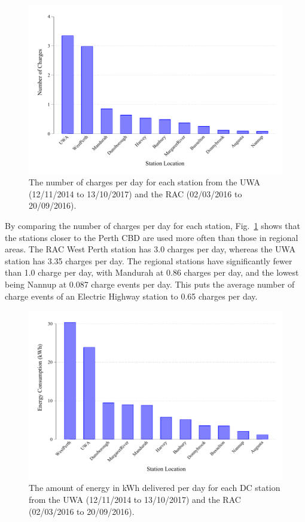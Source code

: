 \begin{figure}[H]
	\centering
	\includegraphics[width=0.8\linewidth]{dc_p}
	\caption[Number of charges per day for each station]{The number of charges per day for each station from the UWA (12/11/2014 to 13/10/2017) and the RAC (02/03/2016 to 20/09/2016).}
	\label{fig:10:dc_p}
\end{figure}

By comparing the number of charges per day for each station, Fig.~\ref{fig:10:dc_p} shows that the stations closer to the Perth CBD are used more often than those in regional areas. The RAC West Perth station has 3.0 charges per day, whereas the UWA station has 3.35 charges per day. The regional stations have significantly fewer than 1.0 charge per day, with Mandurah at 0.86 charges per day, and the lowest being Nannup at 0.087 charge events per day. This puts the average number of charge events of an Electric Highway station to 0.65 charges per day.


\begin{figure}[H]
	\centering
	\includegraphics[width=0.8\linewidth]{dc_p_e}
	\caption[Amount of energy delivered per day for each station]{The amount of energy in kWh delivered per day for each DC station from the UWA (12/11/2014 to 13/10/2017) and the RAC (02/03/2016 to 20/09/2016).}
	\label{fig:10:dc_p_e}
\end{figure}

